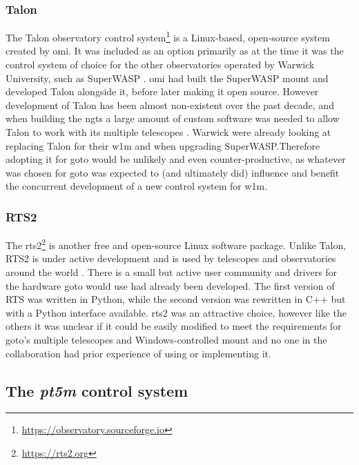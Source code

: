 \begin{colsection}
\begin{colsection}
\subsubsection{Talon}

The Talon observatory control system\footnote{\url{https://observatory.sourceforge.io}} is a Linux-based, open-source system created by \gls{omi}. It was included as an option primarily as at the time it was the control system of choice for the other observatories operated by Warwick University, such as SuperWASP \citep{SuperWASP}. \gls{omi} had built the SuperWASP mount and developed Talon alongside it, before later making it open source. However development of Talon has been almost non-existent over the past decade, and when building the \gls{ngts} a large amount of custom software was needed to allow Talon to work with its multiple telescopes \citep{ngts}. Warwick were already looking at replacing Talon for their \gls{w1m} and when upgrading SuperWASP.\@ Therefore adopting it for \gls{goto} would be unlikely and even counter-productive, as whatever was chosen for \gls{goto} was expected to (and ultimately did) influence and benefit the concurrent development of a new control system for \gls{w1m}.

\subsubsection{RTS2}

The \gls{rts2}\footnote{\url{https://rts2.org}} \citep{RTS2, RTS2b} is another free and open-source Linux software package. Unlike Talon, RTS2 is under active development and is used by telescopes and observatories around the world \citep{BORAT, BOOTES-3, antarctic, ARTN}. There is a small but active user community and drivers for the hardware \gls{goto} would use had already been developed. The first version of RTS was written in Python, while the second version was rewritten in C++ but with a Python interface available. \gls{rts2} was an attractive choice, however like the others it was unclear if it could be easily modified to meet the requirements for \gls{goto}'s multiple telescopes and Windows-controlled mount and no one in the collaboration had prior experience of using or implementing it.

\end{colsection}


\subsection{The \textit{pt5m} control system}
\label{sec:pt5m}
\begin{colsection}


\end{colsection}
\end{colsection}
